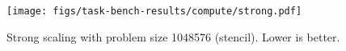 \begin{figure}[t]
\centering
\texttt{[image: figs/task-bench-results/compute/strong.pdf]}
\vspace{-0.5cm}
\caption{Strong scaling with problem size 1048576 (stencil). Lower is better.\label{fig:strong-scaling}}
\vspace{-0.05cm}
\end{figure}
